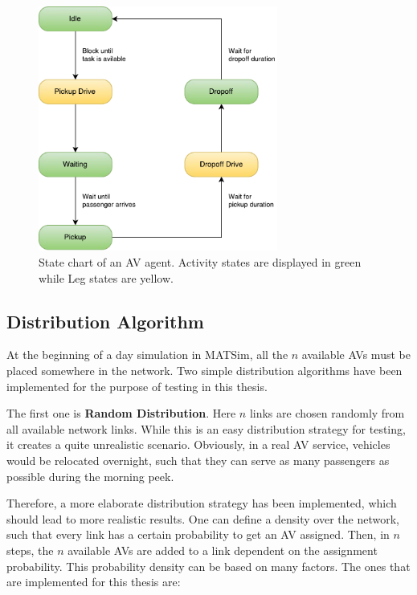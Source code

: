\begin{figure}
    \centering
    \includegraphics[width=0.7\textwidth]{figures/avstates.pdf}
    \caption{State chart of an AV agent. Activity states are displayed in green while Leg states are yellow.}
    \label{fig:avstates}
\end{figure}

\subsection{Distribution Algorithm}

At the beginning of a day simulation in MATSim, all the $n$ available AVs must be placed
somewhere in the network. Two simple distribution algorithms have been implemented
for the purpose of testing in this thesis.

The first one is \textbf{Random Distribution}. Here $n$ links are chosen randomly
from all available network links. While this is an easy distribution strategy for testing,
it creates a quite unrealistic scenario. Obviously, in a real AV service, vehicles
would be relocated overnight, such that they can serve as many passengers as
possible during the morning peek.

Therefore, a more elaborate distribution strategy has been implemented, which should
lead to more realistic results. One can define a density over the network,
such that every link has a certain probability to get an AV assigned. Then, in $n$
steps, the $n$ available AVs are added to a link dependent on the assignment
probability. This probability density can be based on many factors. The ones that are implemented
for this thesis are:


